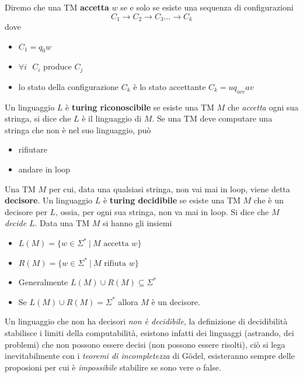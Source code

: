 \documentclass[10pt, letterpaper]{report}
\begin{document}
 Diremo che una TM \textbf{accetta} $w$ se e solo se esiste una sequenza di configurazioni 
 $$ C_1\rightarrow C_2\rightarrow C_3\dots\rightarrow C_k$$
 dove \begin{itemize}
    \item $C_1=q_0w$ 
    \item $\forall i \ \ \ C_i$ produce $C_j$
    \item lo stato della configurazione $C_k$ è lo stato accettante $C_k=uq_{acc}av$
 \end{itemize}
  Un linguaggio $L$ è \textbf{turing riconoscibile} se esiste una TM $M$ che 
 \textit{accetta} ogni sua stringa, si dice che $L$ è il linguaggio di $M$.\acc 
 Se una TM deve computare una stringa che non è nel suo linguaggio, può \begin{itemize}
    \item rifiutare 
    \item andare in loop
 \end{itemize}
 Una TM $M$ per cui, data una qualsiasi stringa, non vai mai in loop, viene detta \textbf{decisore}.\acc 
  Un linguaggio $L$ è \textbf{turing decidibile} se esiste una TM $M$ che è un 
 decisore per $L$, ossia, per ogni sua stringa, non va mai in loop. Si dice che $M$ \textit{decide} $L$.\acc 
Data una TM $M$ si hanno gli insiemi \begin{itemize}
    \item $L(M)=\{w\in\Sigma^* \ | \ M\text{ accetta }w \}$
    \item $R(M)=\{w\in\Sigma^* \ | \ M\text{ rifiuta }w \}$
    \item Generalmente $L(M)\cup R(M)\subseteq \Sigma^*$
    \item Se $L(M)\cup R(M)= \Sigma^*$ allora $M$ è un decisore.
 \end{itemize}
 Un linguaggio che non ha decisori \textit{non è decidibile}, la definizione di decidibilità stabilisce i limiti della 
 computabilità, esistono infatti dei linguaggi (astrando, dei problemi) che non possono essere decisi (non possono essere 
 risolti), ciò si lega inevitabilmente con i \textit{teoremi di incompletezza} di Gödel, esisteranno sempre 
 delle proposioni per cui è \textit{impossibile} stabilire se sono vere o false. 
\end{document}
